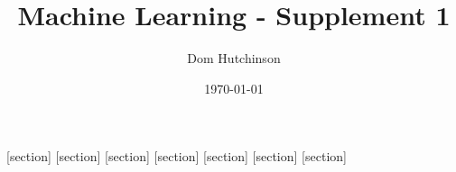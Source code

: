 \documentclass[11pt,a4paper]{article}
\begin{document}
\pagestyle{fancy}
\setlength\parindent{0pt}
\allowdisplaybreaks

\renewcommand{\headrulewidth}{0pt}

\title{Machine Learning - Supplement 1}
\author{Dom Hutchinson}
\date{\today}
\maketitle

\fancyhead[R]{\today}


[section]
[section]
[section]
[section]
[section]
[section]
[section]

\newcommand{\dotprod}[0]{\boldsymbol{\cdot}}
\newcommand{\cosech}[0]{\mathrm{cosech}\ }
\newcommand{\cosec}[0]{\mathrm{cosec}\ }
\newcommand{\sech}[0]{\mathrm{sech}\ }
\newcommand{\prob}[0]{\mathbb{P}}
\newcommand{\nats}[0]{\mathbb{N}}
\newcommand{\cov}[0]{\mathrm{Cov}}
\newcommand{\var}[0]{\mathrm{Var}}
\newcommand{\expect}[0]{\mathbb{E}}
\newcommand{\reals}[0]{\mathbb{R}}
\newcommand{\integers}[0]{\mathbb{Z}}
\newcommand{\indicator}[0]{\mathds{1}}
\newcommand{\nb}[0]{\textit{N.B.} }
\newcommand{\ie}[0]{\textit{i.e.} }
\newcommand{\eg}[0]{\textit{e.g.} }
\newcommand{\X}[0]{\textbf{X}}
\newcommand{\x}[0]{\textbf{x}}
\newcommand{\iid}[0]{\overset{\text{iid}}{\sim}}
\newcommand{\proved}[0]{$\hfill\square$\\}
\end{document}
